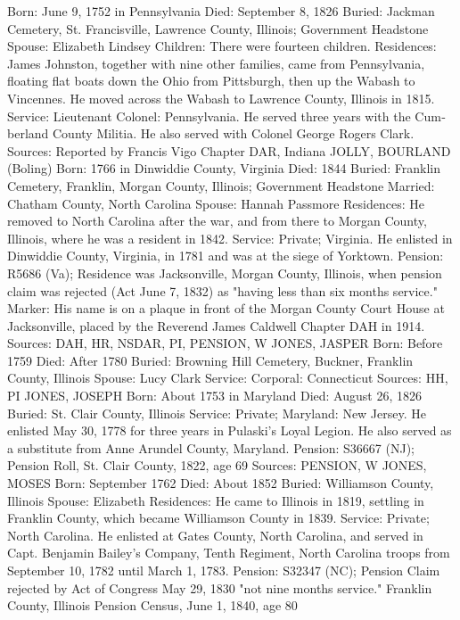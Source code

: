 Born: June 9, 1752 in Pennsylvania
Died: September 8, 1826 
Buried: Jackman Cemetery, St. Francisville, Lawrence County, Illinois; Government Headstone 
Spouse: Elizabeth Lindsey 
Children: There were fourteen children. 
Residences: James Johnston, together with nine other families, came from Pennsylvania, floating flat boats down the Ohio from Pittsburgh, then up the Wabash to Vincennes. He moved across the Wabash to Lawrence County, Illinois in 1815. 
Service: Lieutenant Colonel: Pennsylvania. He served three years with the Cum­berland County Militia. He also served with Colonel George Rogers Clark. 
Sources: Reported by Francis Vigo Chapter DAR, Indiana 
JOLLY, BOURLAND (Boling) 
Born: 1766 in Dinwiddie County, Virginia 
Died: 1844 
Buried: Franklin Cemetery, Franklin, Morgan County, Illinois; Government Head­stone 
Married: Chatham County, North Carolina 
Spouse: Hannah Passmore 
Residences: He removed to North Carolina after the war, and from there to Morgan County, Illinois, where he was a resident in 1842. 
Service: Private; Virginia. He enlisted in Dinwiddie County, Virginia, in 1781 and was at the siege of Yorktown. 
Pension: R5686 (Va); Residence was Jacksonville, Morgan County, Illinois, when pension claim was rejected (Act June 7, 1832) as "having less than six months service." 
Marker: His name is on a plaque in front of the Morgan County Court House at Jacksonville, placed by the Reverend James Caldwell Chapter DAH in 1914. 
Sources: DAH, HR, NSDAR, PI, PENSION, W 
JONES, JASPER
Born: Before 1759
Died: After 1780 
Buried: Browning Hill Cemetery, Buckner, Franklin County, Illinois 
Spouse: Lucy Clark 
Service: Corporal: Connecticut 
Sources: HH, PI  
JONES, JOSEPH 
Born: About 1753 in Maryland
Died: August 26, 1826 
Buried: St. Clair County, Illinois
Service: Private; Maryland: New Jersey. He enlisted May 30, 1778 for three years in Pulaski's Loyal Legion. He also served as a substitute from Anne Arundel County, Maryland.
Pension: S36667 (NJ); Pension Roll, St. Clair County, 1822, age 69 
Sources: PENSION, W 
JONES, MOSES 
Born: September 1762
Died: About 1852 
Buried: Williamson County, Illinois 
Spouse: Elizabeth 
Residences: He came to Illinois in 1819, settling in Franklin County, which became Williamson County in 1839.
Service: Private; North Carolina. He enlisted at Gates County, North Carolina, and served in Capt. Benjamin Bailey's Company, Tenth Regiment, North Carolina troops from September 10, 1782 until March 1, 1783.
Pension: S32347 (NC); Pension Claim rejected by Act of Congress May 29, 1830 "not nine months service." Franklin County, Illinois Pension Census, June 1, 1840, age 80 
